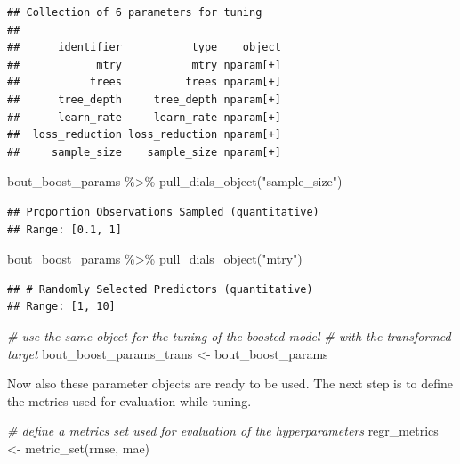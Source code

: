 \documentclass[
]{book}
\newenvironment{Shaded}{\begin{snugshade}}{\end{snugshade}}
\newcommand{\CommentTok}[1]{\textcolor[rgb]{0.56,0.35,0.01}{\textit{#1}}}
\newcommand{\FunctionTok}[1]{\textcolor[rgb]{0.00,0.00,0.00}{#1}}
\newcommand{\NormalTok}[1]{#1}
\newcommand{\OtherTok}[1]{\textcolor[rgb]{0.56,0.35,0.01}{#1}}
\newcommand{\SpecialCharTok}[1]{\textcolor[rgb]{0.00,0.00,0.00}{#1}}
\newcommand{\StringTok}[1]{\textcolor[rgb]{0.31,0.60,0.02}{#1}}
\begin{document}
\begin{verbatim}
## Collection of 6 parameters for tuning
## 
##      identifier           type    object
##            mtry           mtry nparam[+]
##           trees          trees nparam[+]
##      tree_depth     tree_depth nparam[+]
##      learn_rate     learn_rate nparam[+]
##  loss_reduction loss_reduction nparam[+]
##     sample_size    sample_size nparam[+]
\end{verbatim}

\begin{Shaded}
\begin{Highlighting}[]
\NormalTok{bout\_boost\_params }\SpecialCharTok{\%\textgreater{}\%}
  \FunctionTok{pull\_dials\_object}\NormalTok{(}\StringTok{"sample\_size"}\NormalTok{)}
\end{Highlighting}
\end{Shaded}

\begin{verbatim}
## Proportion Observations Sampled (quantitative)
## Range: [0.1, 1]
\end{verbatim}

\begin{Shaded}
\begin{Highlighting}[]
\NormalTok{bout\_boost\_params }\SpecialCharTok{\%\textgreater{}\%}
  \FunctionTok{pull\_dials\_object}\NormalTok{(}\StringTok{"mtry"}\NormalTok{)}
\end{Highlighting}
\end{Shaded}

\begin{verbatim}
## # Randomly Selected Predictors (quantitative)
## Range: [1, 10]
\end{verbatim}

\begin{Shaded}
\begin{Highlighting}[]
\CommentTok{\# use the same object for the tuning of the boosted model}
\CommentTok{\# with the transformed target}
\NormalTok{bout\_boost\_params\_trans }\OtherTok{\textless{}{-}}\NormalTok{ bout\_boost\_params}
\end{Highlighting}
\end{Shaded}

Now also these parameter objects are ready to be used. The next step is to define the metrics used for evaluation while tuning.

\begin{Shaded}
\begin{Highlighting}[]
\CommentTok{\# define a metrics set used for evaluation of the hyperparameters}
\NormalTok{regr\_metrics }\OtherTok{\textless{}{-}} \FunctionTok{metric\_set}\NormalTok{(rmse, mae)}
\end{Highlighting}
\end{Shaded}
\end{document}
